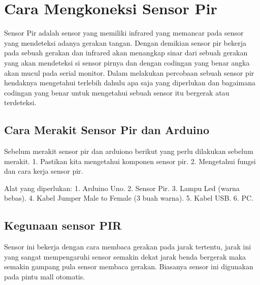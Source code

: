 
\section {Cara Mengkoneksi Sensor Pir}

Sensor Pir adalah sensor yang memiliki infrared yang memancar pada sensor yang mendeteksi adanya gerakan tangan.
Dengan demikian sensor pir bekerja pada sebuah gerakan dan infrared akan menangkap sinar dari sebuah gerakan yang akan mendeteksi si sensor pirnya dan dengan codingan yang benar angka akan mucul pada serial monitor.
Dalam melakukan percobaan sebuah sensor pir hendaknya mengetahui terlebih dahulu apa saja yang diperlukan dan bagaimana codingan yang benar untuk mengetahui sebuah sensor itu bergerak atau terdeteksi. 

\subsection {Cara Merakit Sensor Pir dan Arduino}

Sebelum merakit sensor pir dan arduiono berikut yang perlu dilakukan sebelum merakit.
1. Pastikan kita mengetahui komponen sensor pir.
2. Mengetahui fungsi dan cara kerja sensor pir.

Alat yang diperlukan:
1. Arduino Uno.
2. Sensor Pir.
3. Lampu Led (warna bebas).
4. Kabel Jumper Male to Female (3 buah warna).
5. Kabel USB.
6. PC.

\subsection {Kegunaan sensor PIR}
Sensor ini bekerja dengan cara membaca gerakan pada jarak tertentu, jarak ini yang sangat mempengaruhi sensor semakin dekat jarak benda bergerak maka semakin gampang pula sensor membaca gerakan.
Biasanya sensor ini digunakan pada pintu mall otomatis.